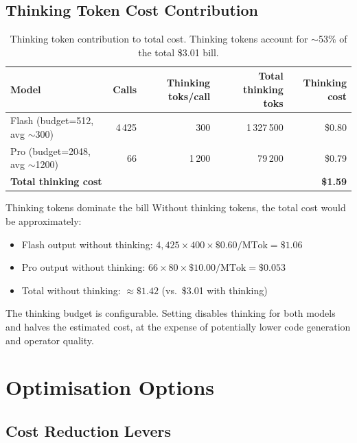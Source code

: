 \documentclass[11pt,a4paper]{report}
\begin{document}
\section{Thinking Token Cost Contribution}

\begin{table}[h]
\centering
\begin{tabular}{@{}lrrrr@{}}
\toprule
\textbf{Model} & \textbf{Calls} & \textbf{Thinking toks/call} & \textbf{Total thinking toks} & \textbf{Thinking cost} \\
\midrule
Flash (budget=512,  avg $\sim$300) & 4\,425 & 300 & 1\,327\,500 & \$0.80 \\
Pro   (budget=2048, avg $\sim$1200) &    66 & 1\,200 & 79\,200 & \$0.79 \\
\midrule
\textbf{Total thinking cost} & & & & \textbf{\$1.59} \\
\bottomrule
\end{tabular}
\caption{Thinking token contribution to total cost.
         Thinking tokens account for $\sim$53\% of the total \$3.01 bill.}
\end{table}

\begin{warnbox}{Thinking tokens dominate the bill}
Without thinking tokens, the total cost would be approximately:
\begin{itemize}[nosep]
  \item Flash output without thinking: $4{,}425 \times 400 \times \$0.60/\text{MTok} = \$1.06$
  \item Pro output without thinking: $66 \times 80 \times \$10.00/\text{MTok} = \$0.053$
  \item Total without thinking: $\approx\$1.42$ (vs.\ \$3.01 with thinking)
\end{itemize}
The thinking budget is configurable.  Setting  disables thinking
for both models and halves the estimated cost, at the expense of potentially lower
code generation and operator quality.
\end{warnbox}


\chapter{Optimisation Options}

\section{Cost Reduction Levers}
\end{document}
